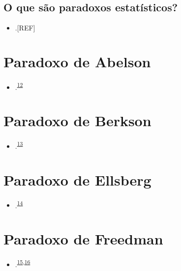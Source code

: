 \documentclass[
  a4paper,
]{book}
\providecommand{\tightlist}{%
  \setlength{\itemsep}{0pt}\setlength{\parskip}{0pt}}
\begin{document}
\hypertarget{o-que-suxe3o-paradoxos-estatuxedsticos}{%
\subsection{O que são paradoxos estatísticos?}\label{o-que-suxe3o-paradoxos-estatuxedsticos}}

\begin{itemize}
\tightlist
\item
  .{[}REF{]}
\end{itemize}

\hypertarget{abelson}{%
\section{Paradoxo de Abelson}\label{abelson}}

\begin{itemize}
\tightlist
\item
  .\textsuperscript{\protect\hyperlink{ref-abelson1985}{12}}
\end{itemize}

\hypertarget{Berkson}{%
\section{Paradoxo de Berkson}\label{Berkson}}

\begin{itemize}
\tightlist
\item
  .\textsuperscript{\protect\hyperlink{ref-berkson1946}{13}}
\end{itemize}

\hypertarget{ellsberg}{%
\section{Paradoxo de Ellsberg}\label{ellsberg}}

\begin{itemize}
\tightlist
\item
  .\textsuperscript{\protect\hyperlink{ref-ellsberg1961}{14}}
\end{itemize}

\hypertarget{freedman}{%
\section{Paradoxo de Freedman}\label{freedman}}

\begin{itemize}
\tightlist
\item
  .\textsuperscript{\protect\hyperlink{ref-freedman1983}{15},\protect\hyperlink{ref-freedman1989}{16}}
\end{itemize}
\end{document}
